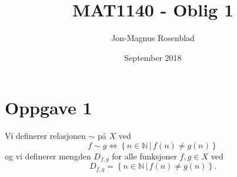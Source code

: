 \documentclass{article}[norsk]
\title{MAT1140 - Oblig 1}
\author{Jon-Magnus Rosenblad}
\date{September 2018}
\begin{document}
\maketitle

\section*{Oppgave 1}
Vi definerer relasjonen $\sim$ på $X$ ved
\begin{equation*}
	f\sim g \Longleftrightarrow \left\{n\in \mathbb{N} \,|\, f(n) \neq g(n)\right\}
\end{equation*}
og vi definerer mengden $D_{f,g}$ for alle funksjoner $f,g\in X$ ved 
\begin{equation*}
D_{f,g} = \left\{n\in\mathbb{N} \, |\, f(n)\neq g(n)\right\}.
\end{equation*}
\end{document}
